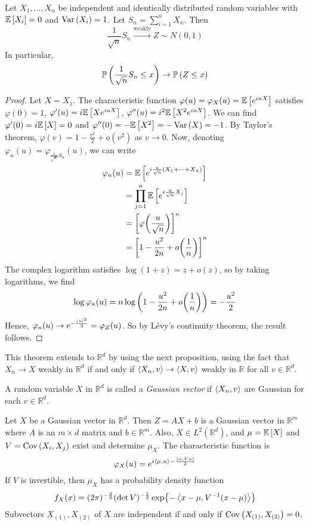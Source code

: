 \begin{theorem}
	Let \( X_1, \dots, X_n \) be independent and identically distributed random variables with \( \mathbb{E}\left[{X_i}\right] = 0 \) and \( \operatorname{Var}\left({X_i}\right) = 1 \).
	Let \( S_n = \sum_{i=1}^n X_n \).
	Then
	\[ \frac{1}{\sqrt{n}} S_n \xrightarrow{\text{weakly}} Z \sim N(0,1) \]
	In particular,
	\[ \mathbb{P}\left({\frac{1}{\sqrt{n}} S_n \leq x}\right) \to \mathbb{P}\left({Z \leq x}\right) \]
\end{theorem}
\begin{proof}
	Let \( X = X_1 \).
	The characteristic function \( \varphi(u) = \varphi_X(u) = \mathbb{E}\left[{e^{iuX}}\right] \) satisfies \( \varphi(0) = 1 \), \( \varphi'(u) = i \mathbb{E}\left[{X e^{iuX}}\right] \), \( \varphi''(u) = i^2 \mathbb{E}\left[{X^2 e^{iuX}}\right] \).
	We can find \( \varphi'(0) = i\mathbb{E}\left[{X}\right] = 0 \) and \( \varphi''(0) = -\mathbb{E}\left[{X^2}\right] = -\operatorname{Var}\left({X}\right) = -1 \).
	By Taylor's theorem, \( \varphi(v) = 1 - \frac{v^2}{2} + o(v^2) \) as \( v \to 0 \).
	Now, denoting \( \varphi_n(u) = \varphi_{\frac{1}{\sqrt n} S_n}(u) \), we can write
	\begin{align*}
		\varphi_n(u) &= \mathbb{E}\left[{e^{i\frac{u}{\sqrt n} (X_1 + \dots + X_n)}}\right] \\
		&= \prod_{j=1}^n \mathbb{E}\left[{e^{i\frac{u}{\sqrt n} X_j}}\right] \\
		&= \qty[\varphi\qty(\frac{u}{\sqrt n})]^n \\
		&= \qty[1 - \frac{u^2}{2n} + o\qty(\frac{1}{n})]^n
	\end{align*}
	The complex logarithm satisfies \( \log(1 + z) = z + o(z) \), so by taking logarithms, we find
	\[ \log \varphi_n(u) = n \log\qty(1 - \frac{u^2}{2n} + o\qty(\frac{1}{n})) = -\frac{u^2}{2} \]
	Hence, \( \varphi_n(u) \to e^{-\frac{\abs{u}^2}{2}} = \varphi_Z(u) \).
	So by L\'evy's continuity theorem, the result follows.
\end{proof}
\begin{remark}
	This theorem extends to \( \mathbb R^d \) by using the next proposition, using the fact that \( X_n \to X \) weakly in \( \mathbb R^d \) if and only if \( \left\langle{X_n, v}\right\rangle \to \left\langle{X, v}\right\rangle \) weakly in \( \mathbb R \) for all \( v \in \mathbb R^d \).
\end{remark}
\begin{definition}
	A random variable \( X \) in \( \mathbb R^d \) is called a \emph{Gaussian vector} if \( \left\langle{X_n, v}\right\rangle \) are Gaussian for each \( v \in \mathbb R^d \).
\end{definition}
\begin{proposition}
	Let \( X \) be a Gaussian vector in \( \mathbb R^d \).
	Then \( Z = AX + b \) is a Gaussian vector in \( \mathbb R^m \) where \( A \) is an \( m \times d \) matrix and \( b \in \mathbb R^m \).
	Also, \( X \in L^2(\mathbb R^d) \), and \( \mu = \mathbb{E}\left[{X}\right] \) and \( V = \operatorname{Cov}\left({X_i, X_j}\right) \) exist and determine \( \mu_X \).
	The characteristic function is
	\[ \varphi_X(u) = e^{i\left\langle{\mu,u}\right\rangle - \frac{\left\langle{u,Vu}\right\rangle}{2}} \]
	If \( V \) is invertible, then \( \mu_X \) has a probability density function
	\[ f_X(x) = (2\pi)^{-\frac{d}{2}} (\det V)^{-\frac{1}{2}} \exp{-\left\langle{x-\mu, V^{-1}(x - \mu)}\right\rangle} \]
	Subvectors \( X_{(1)}, X_{(2)} \) of \( X \) are independent if and only if \( \operatorname{Cov}\left({X_{(1)}, X_{(2)}}\right) = 0 \).
\end{proposition}
